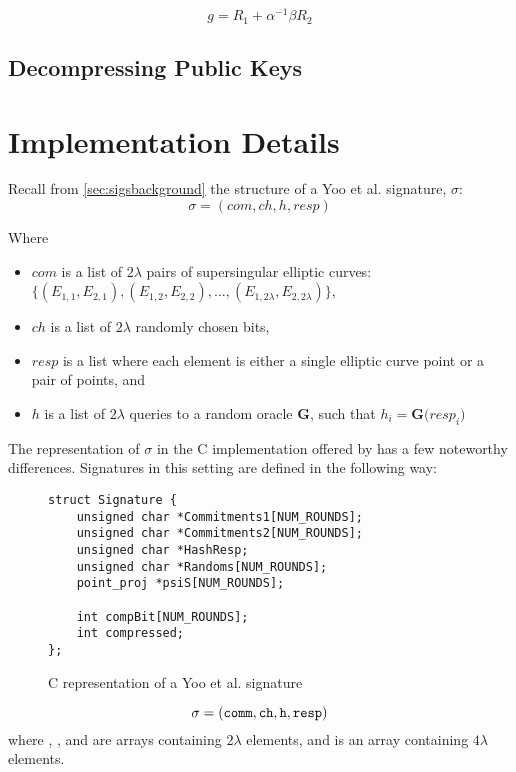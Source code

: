 $$
g = R_1 + \alpha^{-1}\beta R_2
$$



\subsection{Decompressing Public Keys}


\section{Implementation Details}
\label{sec:compimplementation}

Recall from \ref{sec:sigsbackground} the structure of a Yoo et al. signature, $\sigma$:
$$
\sigma = (com, ch, h, resp)
$$

\noindent
Where

\begin{itemize}
\item $com$ is a list of $2\lambda$ pairs of supersingular elliptic curves: $\{(E_{1,1}, E_{2,1}), (E_{1,2}, E_{2,2}), ..., (E_{1,2\lambda}, E_{2,2\lambda})\}$,
\item $ch$ is a list of $2\lambda$ randomly chosen bits,
\item $resp$ is a list where each element is either a single elliptic curve point or a pair of points, and
\item $h$ is a list of $2\lambda$ queries to a random oracle \textbf{G}, such that $h_{i} = \textbf{G(}resp_{i}\textbf{)}$
\end{itemize}

The representation of $\sigma$ in the C implementation offered by \cite{yoo} has a few noteworthy differences. Signatures in this setting are defined in the following way:
\begin{figure}[!h]
\begin{lstlisting}
struct Signature {
	unsigned char *Commitments1[NUM_ROUNDS];
	unsigned char *Commitments2[NUM_ROUNDS];
	unsigned char *HashResp;
	unsigned char *Randoms[NUM_ROUNDS];
	point_proj *psiS[NUM_ROUNDS];

	int compBit[NUM_ROUNDS];
	int compressed;
};
\end{lstlisting}
\caption{C representation of a Yoo et al. signature}
\label{code:sigstruct}
\end{figure}

$$
\sigma = (\texttt{comm}, \texttt{ch}, \texttt{h}, \texttt{resp})
$$
where , , and  are arrays containing $2\lambda$ elements, and  is an array containing $4\lambda$ elements. 

